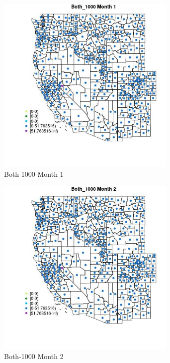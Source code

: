 \begin{figure} 
\centering  
\includegraphics[width=0.77\textwidth]{Code_Outputs/df_report_ML_predictors_CountyCentroid_Locations_Dates_2008-01-01to2018-12-31_MapObsMo1Both_1000.jpg} 
\caption{\label{fig:df_report_ML_predictors_CountyCentroid_Locations_Dates_2008-01-01to2018-12-31MapObsMo1Both_1000}Both-1000 Month 1} 
\end{figure} 
 

\begin{figure} 
\centering  
\includegraphics[width=0.77\textwidth]{Code_Outputs/df_report_ML_predictors_CountyCentroid_Locations_Dates_2008-01-01to2018-12-31_MapObsMo2Both_1000.jpg} 
\caption{\label{fig:df_report_ML_predictors_CountyCentroid_Locations_Dates_2008-01-01to2018-12-31MapObsMo2Both_1000}Both-1000 Month 2} 
\end{figure} 
 


